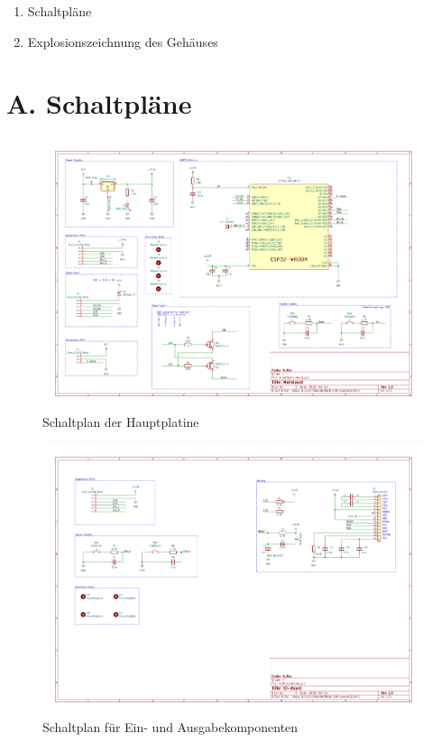 
{\Large
\begin{enumerate}[label=\Alph*.]
	\item Schaltpläne
	\item Explosionszeichnung des Gehäuses
\end{enumerate}
}
\pagebreak
\section*{A. Schaltpläne}
\begin{figure}[H]
    \centering
    \includegraphics[width=0.73\textheight,angle=90]{../PDFs/mainBoard.pdf}
    \caption{Schaltplan der Hauptplatine}
    \label{fig:mainPCB}
\end{figure}

\begin{figure}[H]
    \centering
    \includegraphics[width=0.9\textheight,angle=90]{../PDFs/ioBoard.pdf}
    \caption{Schaltplan für Ein- und Ausgabekomponenten}
    \label{fig:ioPCB}
\end{figure}

